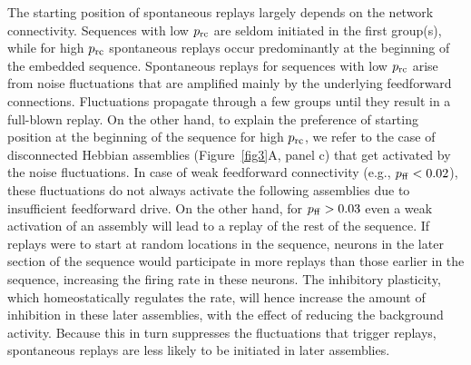     The starting position of spontaneous replays largely depends on the network
    connectivity. Sequences with low $p_{\rm rc}$ are seldom initiated in the
    first group(s), while for high $p_{\rm rc}$ spontaneous replays occur
    predominantly at the beginning of the embedded sequence. Spontaneous
    replays for sequences with low $p_{\rm rc}$ arise from noise fluctuations
    that are amplified mainly by the underlying feedforward connections.
    Fluctuations propagate through a few groups until they result in a
    full-blown replay. On the other hand, to explain the preference of starting
    position at the beginning of the sequence for high $p_{\rm rc}$, we refer
    to the case of disconnected Hebbian assemblies (Figure~\ref{fig3}A, panel c)
    that get activated by the noise fluctuations. In case of weak feedforward
    connectivity (e.g., $p_{\rm ff} < 0.02$), these fluctuations do not always
    activate the following assemblies due to insufficient feedforward drive. On
    the other hand, for $p_{\rm ff} > 0.03$ even a weak activation of an
    assembly will lead to a replay of the rest of the sequence. If replays were
    to start at random locations in the sequence, neurons in the later section
    of the sequence would participate in more replays than those earlier in the
    sequence, increasing the firing rate in these neurons. The inhibitory
    plasticity, which homeostatically regulates the rate, will hence increase
    the amount of inhibition in these later assemblies, with the effect of
    reducing the background activity. Because this in turn suppresses the
    fluctuations that trigger replays, spontaneous replays are less likely to
    be initiated in later assemblies.

